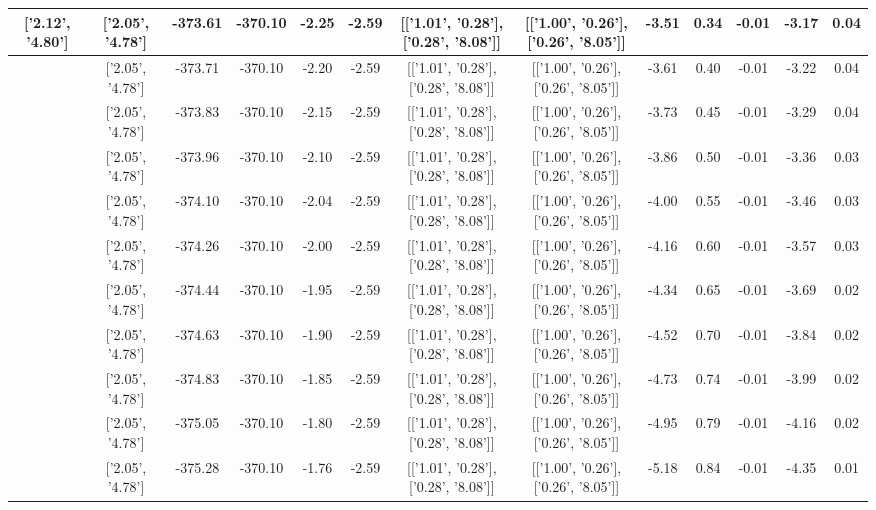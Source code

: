 \begin{table}[htbp]
\begin{adjustbox}{angle=90}
\begin{tabular}{|c|c|c|c|c|c|c|c|c|c|c|c|c|}
 ['2.12', '4.80'] & ['2.05', '4.78'] & -373.61 & -370.10 & -2.25 & -2.59 & [['1.01', '0.28'], ['0.28', '8.08']] & [['1.00', '0.26'], ['0.26', '8.05']] & -3.51 & 0.34 & -0.01 & -3.17 & 0.04\\ \hline
 ['2.14', '4.80'] & ['2.05', '4.78'] & -373.71 & -370.10 & -2.20 & -2.59 & [['1.01', '0.28'], ['0.28', '8.08']] & [['1.00', '0.26'], ['0.26', '8.05']] & -3.61 & 0.40 & -0.01 & -3.22 & 0.04\\ \hline
 ['2.15', '4.80'] & ['2.05', '4.78'] & -373.83 & -370.10 & -2.15 & -2.59 & [['1.01', '0.28'], ['0.28', '8.08']] & [['1.00', '0.26'], ['0.26', '8.05']] & -3.73 & 0.45 & -0.01 & -3.29 & 0.04\\ \hline
 ['2.16', '4.81'] & ['2.05', '4.78'] & -373.96 & -370.10 & -2.10 & -2.59 & [['1.01', '0.28'], ['0.28', '8.08']] & [['1.00', '0.26'], ['0.26', '8.05']] & -3.86 & 0.50 & -0.01 & -3.36 & 0.03\\ \hline
 ['2.17', '4.81'] & ['2.05', '4.78'] & -374.10 & -370.10 & -2.04 & -2.59 & [['1.01', '0.28'], ['0.28', '8.08']] & [['1.00', '0.26'], ['0.26', '8.05']] & -4.00 & 0.55 & -0.01 & -3.46 & 0.03\\ \hline
 ['2.18', '4.81'] & ['2.05', '4.78'] & -374.26 & -370.10 & -2.00 & -2.59 & [['1.01', '0.28'], ['0.28', '8.08']] & [['1.00', '0.26'], ['0.26', '8.05']] & -4.16 & 0.60 & -0.01 & -3.57 & 0.03\\ \hline
 ['2.19', '4.81'] & ['2.05', '4.78'] & -374.44 & -370.10 & -1.95 & -2.59 & [['1.01', '0.28'], ['0.28', '8.08']] & [['1.00', '0.26'], ['0.26', '8.05']] & -4.34 & 0.65 & -0.01 & -3.69 & 0.02\\ \hline
 ['2.20', '4.81'] & ['2.05', '4.78'] & -374.63 & -370.10 & -1.90 & -2.59 & [['1.01', '0.28'], ['0.28', '8.08']] & [['1.00', '0.26'], ['0.26', '8.05']] & -4.52 & 0.70 & -0.01 & -3.84 & 0.02\\ \hline
 ['2.22', '4.82'] & ['2.05', '4.78'] & -374.83 & -370.10 & -1.85 & -2.59 & [['1.01', '0.28'], ['0.28', '8.08']] & [['1.00', '0.26'], ['0.26', '8.05']] & -4.73 & 0.74 & -0.01 & -3.99 & 0.02\\ \hline
 ['2.23', '4.82'] & ['2.05', '4.78'] & -375.05 & -370.10 & -1.80 & -2.59 & [['1.01', '0.28'], ['0.28', '8.08']] & [['1.00', '0.26'], ['0.26', '8.05']] & -4.95 & 0.79 & -0.01 & -4.16 & 0.02\\ \hline
 ['2.24', '4.82'] & ['2.05', '4.78'] & -375.28 & -370.10 & -1.76 & -2.59 & [['1.01', '0.28'], ['0.28', '8.08']] & [['1.00', '0.26'], ['0.26', '8.05']] & -5.18 & 0.84 & -0.01 & -4.35 & 0.01\\ \hline

\end{tabular}
\end{adjustbox}
\end{table}
